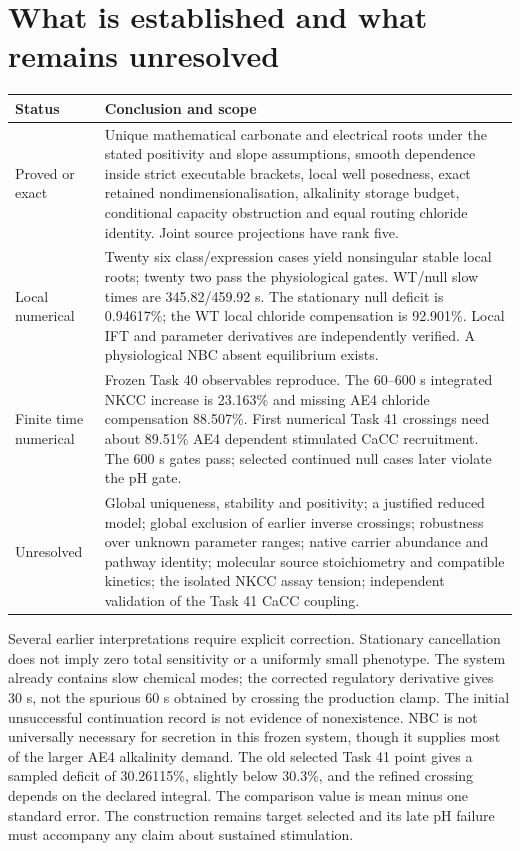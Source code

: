 \section{What is established and what remains unresolved}
\begin{longtable}{p{.17\linewidth}p{.76\linewidth}}
\toprule
Status & Conclusion and scope\\\midrule
\endhead
Proved or exact & Unique mathematical carbonate and electrical roots under
the stated positivity and slope assumptions, smooth dependence inside strict
executable brackets, local well posedness, exact retained nondimensionalisation,
alkalinity storage budget, conditional capacity obstruction and equal routing
chloride identity. Joint source projections have rank five.\\
Local numerical & Twenty six class/expression cases yield nonsingular stable
local roots; twenty two pass the physiological gates. WT/null slow times are
345.82/459.92 s. The stationary null deficit is 0.94617\%; the WT local
chloride compensation is 92.901\%. Local IFT and parameter derivatives
are independently verified. A physiological NBC absent equilibrium exists.\\
Finite time numerical & Frozen Task 40 observables reproduce. The 60--600 s
integrated NKCC increase is 23.163\% and missing AE4 chloride compensation
88.507\%. First numerical Task 41 crossings need about 89.51\% AE4 dependent
stimulated CaCC recruitment. The 600 s gates pass; selected continued null
cases later violate the pH gate.\\
Unresolved & Global uniqueness, stability and positivity; a justified reduced
model; global exclusion of earlier inverse crossings; robustness over unknown
parameter ranges; native carrier abundance and pathway identity; molecular
source stoichiometry and compatible kinetics; the isolated NKCC assay tension;
independent validation of the Task 41 CaCC coupling.\\\bottomrule
\end{longtable}

Several earlier interpretations require explicit correction. Stationary
cancellation does not imply zero total sensitivity or a uniformly small
phenotype. The system already contains slow chemical modes; the corrected
regulatory derivative gives 30 s, not the spurious 60 s obtained by crossing
the production clamp. The initial unsuccessful continuation record is not
evidence of nonexistence. NBC is not universally necessary for secretion
in this frozen system, though it supplies most of the larger AE4 alkalinity
demand. The old selected Task 41 point gives a sampled deficit of
30.26115\%, slightly below 30.3\%, and the refined crossing depends on
the declared integral. The comparison value is mean minus one standard
error. The construction remains target selected and its late pH failure
must accompany any claim about sustained stimulation.

